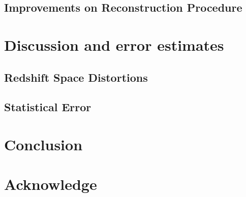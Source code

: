 \documentclass[aps,prd,twocolumn,showpacs,superscriptaddress,groupedaddress,nofootinbib]{revtex4}  %
\begin{document}
\subsection{Improvements on Reconstruction Procedure}

\section{Discussion and error estimates}
\subsection{Redshift Space Distortions}

\subsection{Statistical Error}

\section{Conclusion}

\section{Acknowledge}

%


\end{document}
